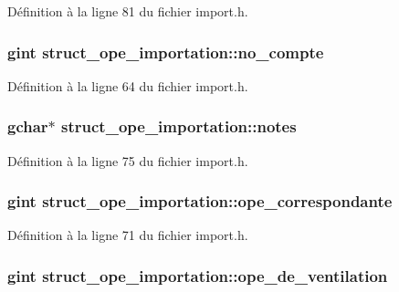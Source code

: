 Définition à la ligne 81 du fichier import.h.

\subsubsection[{no\_\-compte}]{\setlength{\rightskip}{0pt plus 5cm}gint {\bf struct\_\-ope\_\-importation::no\_\-compte}}\label{structstruct__ope__importation_a8f9a20942dd3d0811670c24f9daa1a62}


Définition à la ligne 64 du fichier import.h.

\subsubsection[{notes}]{\setlength{\rightskip}{0pt plus 5cm}gchar$\ast$ {\bf struct\_\-ope\_\-importation::notes}}\label{structstruct__ope__importation_a9e55cfbe35026b7cabdd2d93e6e6dc3a}


Définition à la ligne 75 du fichier import.h.

\subsubsection[{ope\_\-correspondante}]{\setlength{\rightskip}{0pt plus 5cm}gint {\bf struct\_\-ope\_\-importation::ope\_\-correspondante}}\label{structstruct__ope__importation_aab3dedcb8364500b7df11ba68d12541c}


Définition à la ligne 71 du fichier import.h.

\subsubsection[{ope\_\-de\_\-ventilation}]{\setlength{\rightskip}{0pt plus 5cm}gint {\bf struct\_\-ope\_\-importation::ope\_\-de\_\-ventilation}}\label{structstruct__ope__importation_aa550ffd55aca6827a90343fcc251339f}


